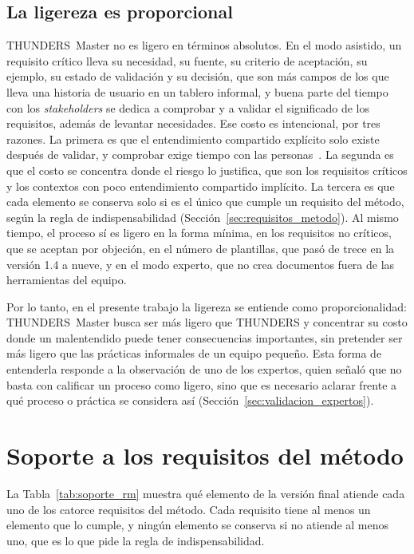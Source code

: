\documentclass[12pt,letterpaper,oneside]{report}
\begin{document}
\subsection{La ligereza es proporcional}
\label{sec:ligereza_proporcional}
THUNDERS~Master no es ligero en términos absolutos. En el modo asistido, un
requisito crítico lleva su necesidad, su fuente, su criterio de aceptación, su ejemplo, su
estado de validación y su decisión, que son más campos de los que lleva una
historia de usuario en un tablero informal, y buena parte del tiempo con los
\textit{stakeholders} se dedica a comprobar y a validar el significado de los requisitos, además de levantar necesidades. Ese costo es intencional, por tres razones. La primera
es que el entendimiento compartido explícito solo existe después de validar, y
comprobar exige tiempo con las personas~\cite{glinz2015shared}. La segunda es que
el costo se concentra donde el riesgo lo justifica, que son los requisitos
críticos y los contextos con poco entendimiento compartido implícito. La tercera es que
cada elemento se conserva solo si es el único que cumple un requisito del
método, según la regla de indispensabilidad
(Sección~\ref{sec:requisitos_metodo}). Al mismo tiempo, el proceso sí es ligero
en la forma mínima, en los requisitos no críticos, que se aceptan por objeción,
en el número de plantillas, que pasó de trece en la versión 1.4 a nueve, y en el
modo experto, que no crea documentos fuera de las herramientas del equipo.

Por lo tanto, en el presente trabajo la ligereza se entiende como proporcionalidad: 
THUNDERS~Master busca ser más ligero que THUNDERS y concentrar su costo donde un 
malentendido puede tener consecuencias importantes, sin pretender ser más ligero 
que las prácticas informales de un equipo pequeño. Esta forma de
entenderla responde a la observación de uno de los expertos, quien señaló que no 
basta con calificar un proceso como ligero, sino que es necesario aclarar frente a 
qué proceso o práctica se considera así (Sección~\ref{sec:validacion_expertos}).

\section{Soporte a los requisitos del método}
\label{sec:soporte_rm}
La Tabla~\ref{tab:soporte_rm} muestra qué elemento de la versión final atiende
cada uno de los catorce requisitos del método. Cada requisito tiene al menos un
elemento que lo cumple, y ningún elemento se conserva si no atiende al menos uno,
que es lo que pide la regla de indispensabilidad.
\end{document}
